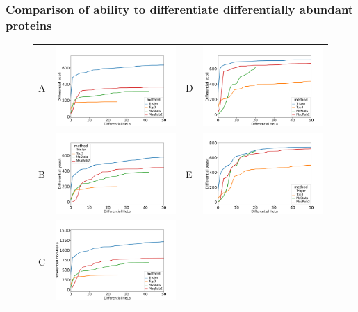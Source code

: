 \documentclass[11pt]{article}
\begin{document}
\subsubsection*{Comparison of ability to differentiate differentially abundant proteins}
\begin{figure}[hbt]
    \centering
    \begin{tabular}{lclc} 
        A & \includegraphics[width=0.4\linewidth]{../../result/report_plots_pipeline/diff_HeLa_vs_nonHeLa_ID_ecoli_0.51.png} & 
        D & \includegraphics[width=0.4\linewidth]{../../result/report_plots_pipeline/diff_HeLa_vs_nonHeLa_PS_ecoli_0.51.png} \\ 
        B & \includegraphics[width=0.4\linewidth]{../../result/report_plots_pipeline/diff_HeLa_vs_nonHeLa_ID_yeast_0.51.png} & 
        E & \includegraphics[width=0.4\linewidth]{../../result/report_plots_pipeline/diff_HeLa_vs_nonHeLa_PS_yeast_0.51.png} \\
        C & \includegraphics[width=0.45\linewidth]{../../result/report_plots_pipeline/diff_HeLa_vs_nonHeLa_ID_all_0.51.png} & 

\end{tabular}
\end{figure}
\end{document}

